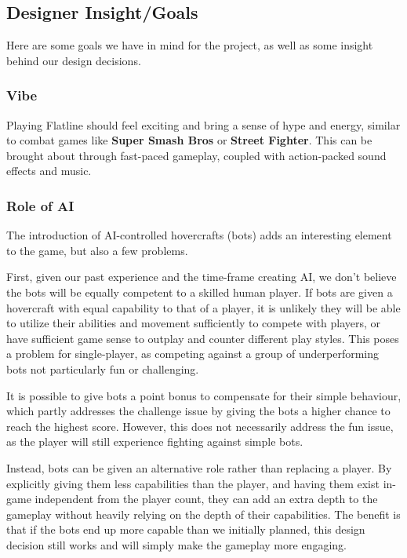 \documentclass{article}
\newcommand{\name}{Flatline}
\theoremstyle{definition}
\begin{document}
\subsection{Designer Insight/Goals}

Here are some goals we have in mind for the project, as well as some insight
behind our design decisions.

\subsubsection{Vibe}

Playing \name{} should feel exciting and bring a sense of hype and energy,
similar to combat games like \textbf{Super Smash Bros} or \textbf{Street
Fighter}. This can be brought about through fast-paced gameplay, coupled with
action-packed sound effects and music.

\subsubsection{Role of AI}

The introduction of AI-controlled hovercrafts (bots) adds an interesting
element to the game, but also a few problems.

First, given our past experience and the time-frame creating AI, we don't
believe the bots will be equally competent to a skilled human player. If bots
are given a hovercraft with equal capability to that of a player, it is
unlikely they will be able to utilize their abilities and movement sufficiently
to compete with players, or have sufficient game sense to outplay and counter
different play styles. This poses a problem for single-player, as competing
against a group of underperforming bots not particularly fun or challenging.

It is possible to give bots a point bonus to compensate for their simple
behaviour, which partly addresses the challenge issue by giving the bots
a higher chance to reach the highest score. However, this does not necessarily
address the fun issue, as the player will still experience fighting against
simple bots.

Instead, bots can be given an alternative role rather than replacing a player.
By explicitly giving them less capabilities than the player, and having them
exist in-game independent from the player count, they can add an extra depth to
the gameplay without heavily relying on the depth of their capabilities. The
benefit is that if the bots end up more capable than we initially planned, this
design decision still works and will simply make the gameplay more engaging.
\end{document}
